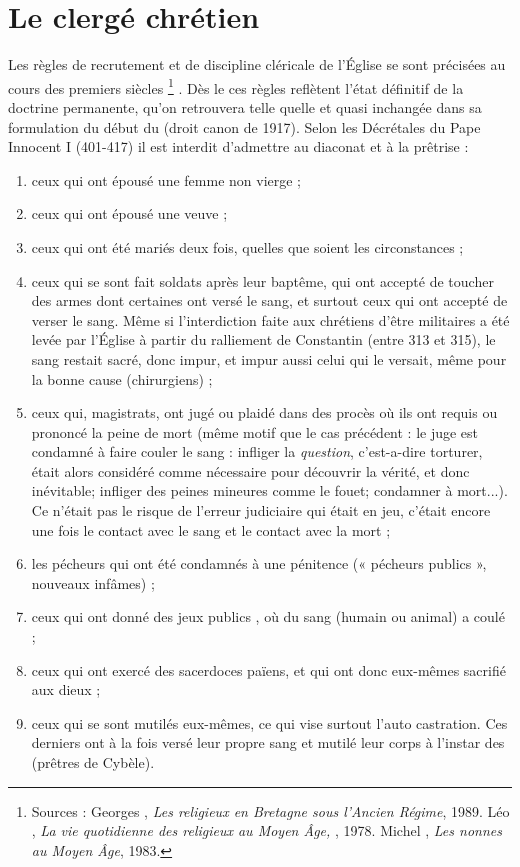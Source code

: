 

\section{Le clergé chrétien}


 Les règles de recrutement et de discipline cléricale de l'Église se sont précisées au cours des premiers siècles%
\footnote{Sources : Georges , \emph{Les religieux en Bretagne sous l'Ancien Régime}, 1989. Léo , \emph{La vie quotidienne des religieux au Moyen Âge, }, 1978. Michel , \emph{Les nonnes au Moyen Âge}, 1983.}%
. Dès le  ces règles reflètent l'état définitif de la doctrine permanente, qu'on retrouvera telle quelle et quasi inchangée dans sa formulation du début du  (droit canon de 1917). Selon les Décrétales du Pape Innocent I (401-417) il est interdit d'admettre au diaconat et à la prêtrise :
\begin{enumerate}
\item ceux qui ont épousé une femme non vierge ;
\item ceux qui ont épousé une veuve ;
\item ceux qui ont été mariés deux fois, quelles que soient les circonstances ;
\item ceux qui se sont fait soldats après leur baptême, qui ont accepté de toucher des armes dont certaines ont versé le sang, et surtout ceux qui ont accepté de verser le sang. Même si l'interdiction faite aux chrétiens d'être militaires a été levée par l'Église à partir du ralliement de Constantin (entre 313 et 315), le sang restait sacré, donc impur, et impur aussi celui qui le versait, même pour la bonne cause (chirurgiens) ;
\item ceux qui, magistrats, ont jugé ou plaidé dans des procès où ils ont requis ou prononcé la peine de mort (même motif que le cas précédent : le juge est condamné à faire couler le sang : infliger la \emph{question}, c'est-a-dire torturer, était alors considéré comme nécessaire pour découvrir la vérité, et donc inévitable; infliger des peines mineures comme le fouet; condamner à mort...). Ce n'était pas le risque de l'erreur judiciaire qui était en jeu, c'était encore une fois le contact avec le sang et le contact avec la mort ;
\item les pécheurs qui ont été condamnés à une pénitence (« pécheurs publics », nouveaux infâmes) ;
\item ceux qui ont donné des jeux publics , où du sang (humain ou animal) a coulé ;
\item ceux qui ont exercé des sacerdoces païens, et qui ont donc eux-mêmes sacrifié aux dieux ;
\item ceux qui se sont mutilés eux-mêmes, ce qui vise surtout l'auto castration. Ces derniers ont à la fois versé leur propre sang et mutilé leur corps à l'instar des  (prêtres de Cybèle).
\end{enumerate}

